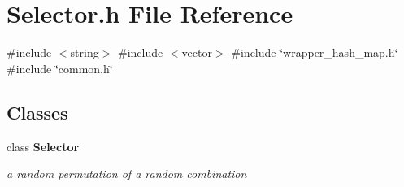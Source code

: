 \section{Selector.\+h File Reference}
\label{Selector_8h}
{\ttfamily \#include $<$string$>$}\newline
{\ttfamily \#include $<$vector$>$}\newline
{\ttfamily \#include \char`\"{}wrapper\+\_\+hash\+\_\+map.\+h\char`\"{}}\newline
{\ttfamily \#include \char`\"{}common.\+h\char`\"{}}\newline
\subsection*{Classes}
\begin{DoxyCompactItemize}
\item 
class \textbf{ Selector}
\begin{DoxyCompactList}\small\item\em a random permutation of a random combination \end{DoxyCompactList}\end{DoxyCompactItemize}
